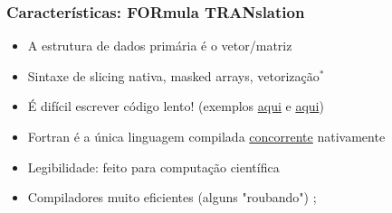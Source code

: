 \documentclass{beamer}
\begin{document}
\begin{darkframes}
  \begin{frame}[label=features]
    \frametitle{Características: FORmula TRANslation}
    \begin{itemize}
    \item A estrutura de dados primária é o vetor/matriz
    \item Sintaxe de slicing nativa, masked arrays, vetorização$^*$
    \item É difícil escrever código lento! (exemplos  \href{https://www.quora.com/Is-there-something-fundamental-to-the-Fortran-language-itself-not-massive-legacy-code-bases-or-time-proven-optimizing-compilers-that-causes-it-to-still-be-preferable-to-speed-critical-numerical-computations-HPC}{aqui} e \href{https://stackoverflow.com/questions/146159/is-fortran-easier-to-optimize-than-c-for-heavy-calculations}{aqui})
    \item Fortran é a única linguagem compilada \href{https://en.wikipedia.org/wiki/Concurrent_computing}{concorrente} nativamente 
    \item Legibilidade: feito para computação científica
    \item Compiladores muito eficientes (alguns "roubando") \hyperlink{compilers}{}; 

\end{itemize}
\end{frame}
\end{darkframes}
\end{document}
